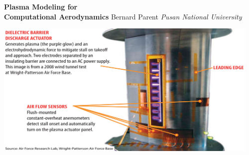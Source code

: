 \documentclass{projector}
\begin{document}
\squeeze


\begin{slide}
\centering
\vfill
{}
\textbf{Plasma Modeling for\\ Computational Aerodynamics}
\vfill
Bernard Parent
\vfill
\emph{Pusan National University}
\vfill
\end{slide}





\begin{slide}
\centering

\includegraphics[width=0.96\textwidth]{wing.jpg} 
\end{slide}
\end{document}
